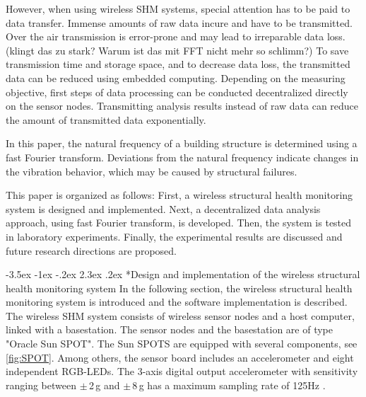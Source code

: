 \documentclass[12pt,a4paper]{scrartcl}
\makeatletter
\renewcommand\section{\@startsection{section}{1}{\z@}%
                     {-3.5ex \@plus -1ex \@minus -.2ex}%
                     {2.3ex \@plus.2ex}%
                     {\normalfont\large\bfseries}}
\makeatother
\begin{document}
However, when using wireless SHM systems, special attention has to be paid to data transfer.
Immense amounts of raw data incure and have to be transmitted.
Over the air transmission is error-prone and may lead to irreparable data loss.  (klingt das zu stark? Warum ist das mit FFT nicht mehr so schlimm?)
To save transmission time and storage space, and to decrease data loss, the transmitted data can be reduced using embedded computing.
Depending on the measuring objective, first steps of data processing can be conducted decentralized directly on the sensor nodes.
Transmitting analysis results instead of raw data can reduce the amount of transmitted data exponentially.

In this paper, the natural frequency of a building structure is determined using a fast Fourier transform.
Deviations from the natural frequency indicate changes in the vibration behavior, which may be caused by structural failures.


This paper is organized as follows:
First, a wireless structural health monitoring system is designed and implemented. 
Next, a decentralized data analysis approach, using fast Fourier transform, is developed.
Then, the system is tested in laboratory experiments.
Finally, the experimental results are discussed and future research directions are proposed.


\section*{Design and implementation of the wireless structural health monitoring system}
In the following section, the wireless structural health monitoring system is introduced and the software implementation is described.
The wireless SHM system consists of wireless sensor nodes and a host computer, linked with a basestation.
The sensor nodes and the basestation are of type "Oracle Sun SPOT". 
The Sun SPOTS are equipped with several components, see \autoref{fig:SPOT}.
Among others, the sensor board includes an accelerometer and eight independent RGB-LEDs.
The 3-axis digital output accelerometer with sensitivity ranging between $\pm$\,2\,g and $\pm$\,8\,g has a maximum sampling rate of 125Hz \citep{eDemo2010}.
\end{document}
